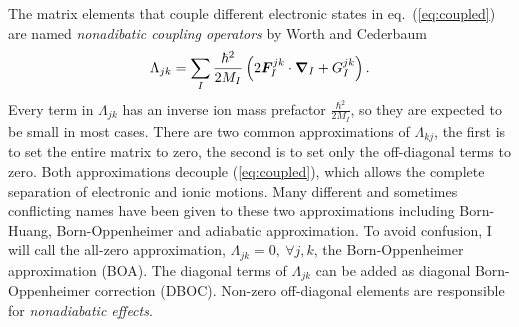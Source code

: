The matrix elements that couple different electronic states in eq.~(\ref{eq:coupled}) are named \emph{nonadibatic coupling operators} by Worth and Cederbaum~\cite{Worth2004}
\begin{align}
\Lambda_{jk} = \sum_I \frac{\hbar^2}{2M_I}\left(2\boldsymbol{F}_I^{jk}\cdot\boldsymbol{\nabla}_I+G_I^{jk}\right).
\end{align}
Every term in $\Lambda_{jk}$ has an inverse ion mass prefactor $\frac{\hbar^2}{2M_I}$, so they are expected to be small in most cases. There are two common approximations of $\Lambda_{kj}$, the first is to set the entire matrix to zero, the second is to set only the off-diagonal terms to zero. Both approximations decouple (\ref{eq:coupled}), which allows the complete separation of electronic and ionic motions.
Many different and sometimes conflicting names have been given to these two approximations including Born-Huang, Born-Oppenheimer and adiabatic approximation. To avoid confusion, I will call the all-zero approximation, $\Lambda_{jk}=0,~\forall j, k$, the Born-Oppenheimer approximation (BOA).
The diagonal terms of $\Lambda_{jk}$ can be added as diagonal Born-Oppenheimer correction (DBOC).
Non-zero off-diagonal elements are responsible for \textit{nonadiabatic effects}.

